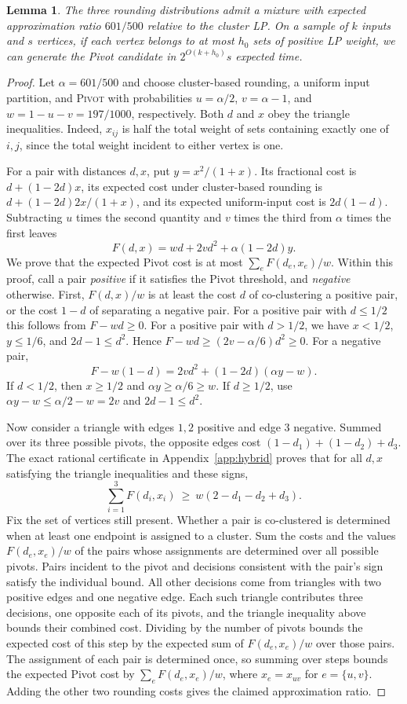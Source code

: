 \documentclass[11pt]{article}
\newtheorem{lemma}[theorem]{Lemma}
\newcommand{\Pivot}{\textsc{Pivot}}
\begin{document}
\begin{lemma}\label{lp:hybrid}
The three rounding distributions admit a mixture with expected
approximation ratio $601/500$ relative to the cluster LP.
On a sample of $k$ inputs and $s$ vertices, if each vertex belongs to at most
$h_0$ sets of positive LP weight, we can generate the Pivot candidate in
$2^{O(k+h_0)}s$ expected time.
\end{lemma}
\begin{proof}
Let $\alpha=601/500$ and choose cluster-based rounding, a uniform
input partition, and
\Pivot{} with probabilities $u=\alpha/2$, $v=\alpha-1$, and
$w=1-u-v=197/1000$, respectively. Both $d$ and $x$ obey the
triangle inequalities. Indeed, $x_{ij}$ is half the total weight
of sets containing exactly one of $i,j$, since the total weight
incident to either vertex is one.

For a pair with distances $d,x$, put $y=x^2/(1+x)$. Its fractional
cost is $d+(1-2d)x$, its expected cost under cluster-based rounding is
$d+(1-2d)2x/(1+x)$, and its expected uniform-input cost is $2d(1-d)$.
Subtracting $u$ times the second quantity and $v$ times the third
from $\alpha$ times the first leaves
\[
 F(d,x)=w d+2v d^2+\alpha(1-2d)y .
\]
We prove that the expected Pivot cost is at most $\sum_e F(d_e,x_e)/w$.
Within this proof, call a pair \emph{positive} if it satisfies the Pivot
threshold, and \emph{negative} otherwise. First, $F(d,x)/w$ is at least the cost $d$ of co-clustering
a positive pair, or the cost $1-d$ of separating a negative pair. For a positive pair with
$d\le1/2$ this follows from $F-wd\ge0$. For a positive pair with
$d>1/2$, we have $x<1/2$, $y\le1/6$, and $2d-1\le d^2$.
Hence $F-wd\ge(2v-\alpha/6)d^2\ge0$. For a negative pair,
\[
 F-w(1-d)=2v d^2+(1-2d)(\alpha y-w).
\]
If $d<1/2$, then $x\ge1/2$ and $\alpha y\ge\alpha/6\ge w$.
If $d\ge1/2$, use $\alpha y-w\le\alpha/2-w=2v$ and $2d-1\le d^2$.

Now consider a triangle with edges $1,2$ positive and edge $3$
negative. Summed over its three possible pivots, the opposite edges
cost $(1-d_1)+(1-d_2)+d_3$. The exact rational certificate in
Appendix~\ref{app:hybrid} proves that for all $d,x$ satisfying the
triangle inequalities and these signs,
\[
 \sum_{i=1}^3 F(d_i,x_i)\ \ge\ w(2-d_1-d_2+d_3).
\]
Fix the set of vertices still present. Whether a pair is co-clustered is determined when at least one endpoint
is assigned to a cluster. Sum the costs and the values $F(d_e,x_e)/w$ of
the pairs whose assignments are determined over all possible pivots. Pairs incident to the pivot
and decisions consistent with the pair's sign satisfy the individual
bound. All other decisions come from triangles with two positive edges
and one negative edge. Each such triangle contributes three decisions,
one opposite each of its pivots, and the triangle inequality above
bounds their combined cost. Dividing by the number of pivots bounds
the expected cost of this step by the expected sum of $F(d_e,x_e)/w$ over
those pairs. The assignment of each pair is determined once, so summing over steps
bounds the expected Pivot cost by $\sum_e F(d_e,x_e)/w$, where
$x_e=x_{uv}$ for $e=\{u,v\}$. Adding the other two rounding costs gives
the claimed approximation ratio.


\end{proof}
\end{document}
